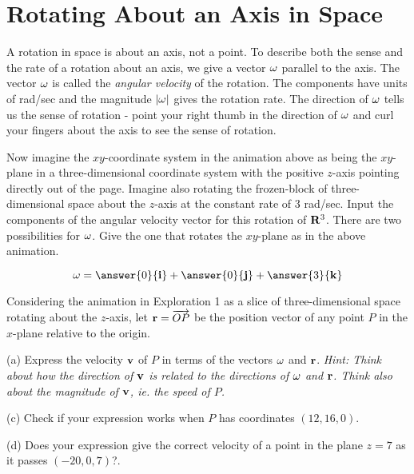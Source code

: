 \documentclass{ximera}
\begin{document}


\section{Rotating About an Axis in Space}
A rotation in space is about an axis, not a point. To describe both the sense and the rate of a rotation about an axis, we give a vector ${\bf \omega}$ parallel to the axis. The vector ${\bf\omega}$ is called the \emph{angular velocity} of the rotation. The components have units of rad/sec and the magnitude $|{\bf \omega}|$ gives the rotation rate. The direction of ${\bf \omega}$ tells us the sense of rotation - point your right thumb in the direction of ${\bf \omega}$ and curl your fingers about the axis to see the sense of rotation.





Now imagine the $xy$-coordinate system in the animation above as being the $xy$-plane in a three-dimensional coordinate system with the positive $z$-axis pointing directly out of the page. Imagine also rotating the frozen-block of three-dimensional space about the $z$-axis at the constant rate of $3$ rad/sec. Input the components of the angular velocity vector for this rotation of ${\bf R}^3$. There are two possibilities for ${\bf \omega}$. Give the one that rotates the $xy$-plane as in the above animation. 

\begin{question}  \label{Qhfnbyt:Cross}
\[
{\bf \omega} = \answer{0}{\bf i} + \answer{0}{\bf j} + \answer{3}{\bf k}
\]
\end{question}

\begin{question}  \label{Qnjy55:Cross}
Considering the animation in Exploration 1 as a slice of three-dimensional space rotating about the $z$-axis, let ${\bf r} = \overrightarrow{OP}$ be the position vector of any point $P$ in the $x$-plane relative to the origin.

(a) Express the velocity ${\bf v}$ of $P$ in terms of the vectors ${\bf\omega}$ and ${\bf r}$. \it{Hint:} Think about how the direction of ${\bf v}$ is related to the directions of ${\bf \omega}$ and ${\bf r}$. Think also about the magnitude of ${\bf v}$, ie. the speed of $P$.

(c) Check if your expression works when $P$ has coordinates $(12, 16,0)$.

(d) Does your expression give the correct velocity of a point in the plane $z=7$ as it passes $(-20,0,7)$?.


\end{question}
\end{document}
